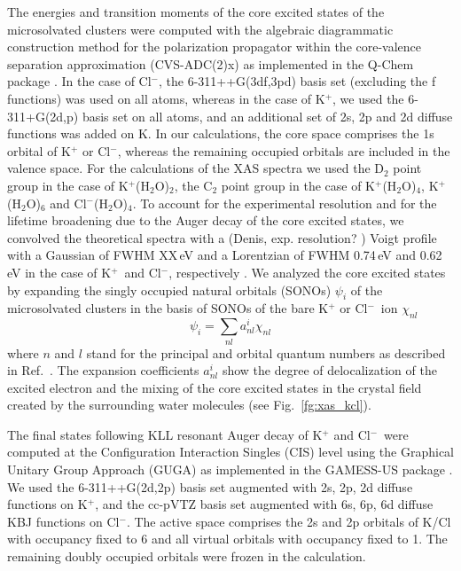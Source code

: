 \documentclass[journal=jacsat,manuscript=suppinfo]{achemso}
\newcommand{\cli}{Cl$^{-}$}
\newcommand{\ki}{K$^{+}$}
\begin{document}
The energies and transition moments of the core excited states of the microsolvated clusters were computed with the algebraic diagrammatic construction method for the polarization propagator \citep{sch82:2395} within the core-valence separation approximation \citep{bar85:867,ced80:206,ced81:1038} (CVS-ADC(2)x) as implemented in the Q-Chem package \citep{Wenzel14:1900,Wenzel14:4583,Wormit14:774,QChem2015}. In the case of \cli, the 6-311++G(3df,3pd) basis set \citep{Krishnan80:650,McLean80:5639} (excluding the f functions) was used on all atoms, whereas in the case of \ki, we used the 6-311+G(2d,p) basis set \citep{Krishnan80:650,Blaudeau97:5016} on all atoms, and an additional set of 2s, 2p and 2d diffuse functions was added on K. In our calculations, the core space comprises the 1s orbital of K$^{+}$ or \cli, whereas the remaining occupied orbitals are included in the valence space. For the calculations of the XAS spectra we used the D$_2$ point group in the case of K$^{+}$(H$_2$O)$_2$, the C$_2$ point group in the case of K$^{+}$(H$_2$O)$_4$, K$^{+}$(H$_2$O)$_6$ and \cli(H$_2$O)$_4$. To account for the experimental resolution and for the lifetime broadening due to the Auger decay of the core excited states, we convolved the theoretical spectra with a {\color{red} (Denis, exp. resolution? ) Voigt profile with a Gaussian of FWHM XX\,eV} and a Lorentzian of FWHM 0.74\,eV and 0.62\,eV in the case of \ki~and \cli, respectively \citep{Krause79:329}. We analyzed the core excited states by expanding the singly occupied natural orbitals (SONOs) $\psi_{i}$ of the microsolvated clusters in the basis of SONOs of the bare K$^{+}$ or \cli~ion $\chi_{nl}$
%
\begin{equation}\label{eq:sono_proj}
\psi_{i} = \sum_{nl} a^{i}_{nl} \chi_{nl}
\end{equation}
%
where $n$ and $l$ stand for the principal and orbital quantum numbers as described in Ref.\ \citep{miteva16:16671}. The expansion coefficients $a^{i}_{nl}$ show the degree of delocalization of the excited electron and the mixing of the core excited states in the crystal field created by the surrounding water molecules (see Fig.\ \ref{fg:xas_kcl}).


The final states following KLL resonant Auger decay of K$^{+}$ and \cli~were computed at the Configuration Interaction Singles (CIS) level using the Graphical Unitary Group Approach (GUGA) as implemented in the GAMESS-US package \citep{GUGA_PhysScr_21,GUGA_JCP_70,GUS}. We used the 6-311++G(2d,2p) basis set \citep{Blaudeau97:5016} augmented with 2s, 2p, 2d diffuse functions on \ki, and the cc-pVTZ basis set augmented with 6s, 6p, 6d diffuse KBJ functions \citep{Kaufmann89:2223} on \cli. The active space comprises the 2s and 2p orbitals of K/Cl with occupancy fixed to 6 and all virtual orbitals with occupancy fixed to 1. The remaining doubly occupied orbitals were frozen in the calculation. \citep{mosnier16:061401}
\end{document}
